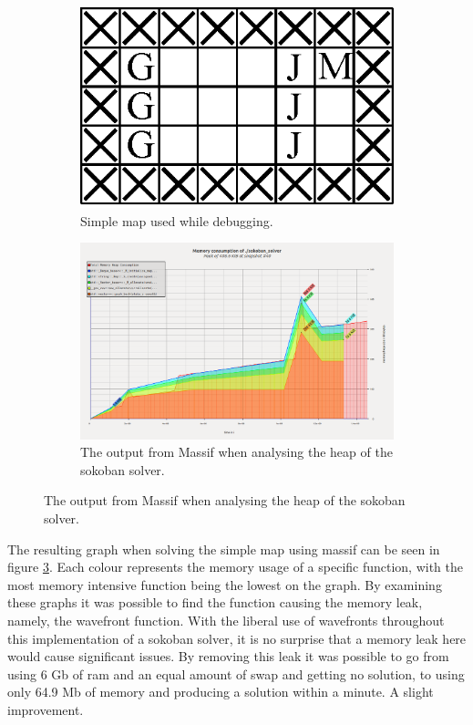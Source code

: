 \begin{figure}
	\begin{subfigure}[t]{.49\linewidth}
		\includegraphics[width=\linewidth]{images/memorymap}
		\caption{Simple map used while debugging.}
		\label{fig:simplemap}
	\end{subfigure}
	\begin{subfigure}[t]{.49\linewidth}
		\includegraphics[width=\linewidth]{images/massif_small}
		\caption{The output from Massif when analysing the heap of the sokoban solver.}
		\label{fig:simplemassif}
	\end{subfigure}
\end{figure}

The resulting graph when solving the simple map using massif can be seen in figure \ref{fig:simplemassif}.
Each colour represents the memory usage of a specific function, with the most memory intensive function being the lowest on the graph.
By examining these graphs it was possible to find the function causing the memory leak, namely, the wavefront function.
With the liberal use of wavefronts throughout this implementation of a sokoban solver, it is no surprise that a memory leak here would cause significant issues.
By removing this leak it was possible to go from using 6 Gb of ram and an equal amount of swap and getting no solution, to using only 64.9 Mb of memory and producing a solution within a minute.
A slight improvement.